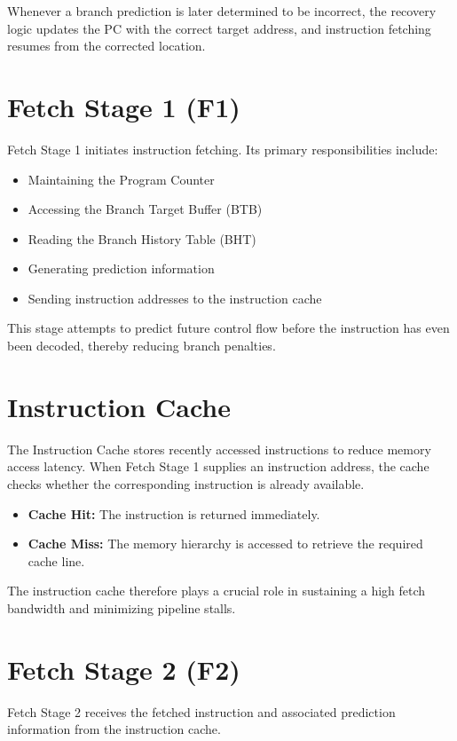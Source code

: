 Whenever a branch prediction is later determined to be incorrect, the recovery logic updates the
PC with the correct target address, and instruction fetching resumes from the corrected location.

\section{Fetch Stage 1 (F1)}

Fetch Stage 1 initiates instruction fetching.
Its primary responsibilities include:
\begin{itemize}
  \item Maintaining the Program Counter
  \item Accessing the Branch Target Buffer (BTB)
  \item Reading the Branch History Table (BHT)
  \item Generating prediction information
  \item Sending instruction addresses to the instruction cache
\end{itemize}

This stage attempts to predict future control flow before the instruction has even been decoded,
thereby reducing branch penalties.

\section{Instruction Cache}

The Instruction Cache stores recently accessed instructions to reduce memory access latency.
When Fetch Stage 1 supplies an instruction address, the cache checks whether the
corresponding instruction is already available.

\begin{itemize}
  \item \textbf{Cache Hit:} The instruction is returned immediately.
  \item \textbf{Cache Miss:} The memory hierarchy is accessed to retrieve the required cache line.
\end{itemize}

The instruction cache therefore plays a crucial role in sustaining a high fetch bandwidth and
minimizing pipeline stalls.

\section{Fetch Stage 2 (F2)}

Fetch Stage 2 receives the fetched instruction and associated prediction information from the
instruction cache.

